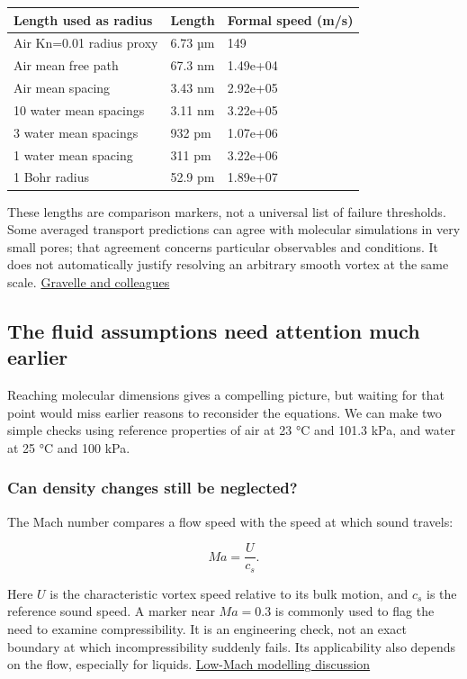 \documentclass[
  english,
  11pt,
]{article}
\newcounter{none} %
\begin{document}
{\def\LTcaptype{none} %
\begin{longtable}[]{@{}lll@{}}
\toprule\noalign{}
Length used as radius & Length & Formal speed (m/s) \\
\midrule\noalign{}
\endhead
\bottomrule\noalign{}
\endlastfoot
Air Kn=0.01 radius proxy & 6.73 µm & 149 \\
Air mean free path & 67.3 nm & 1.49e+04 \\
Air mean spacing & 3.43 nm & 2.92e+05 \\
10 water mean spacings & 3.11 nm & 3.22e+05 \\
3 water mean spacings & 932 pm & 1.07e+06 \\
1 water mean spacing & 311 pm & 3.22e+06 \\
1 Bohr radius & 52.9 pm & 1.89e+07 \\
\end{longtable}
}

These lengths are comparison markers, not a universal list of failure
thresholds. Some averaged transport predictions can agree with molecular
simulations in very small pores; that agreement concerns particular
observables and conditions. It does not automatically justify resolving
an arbitrary smooth vortex at the same scale.
\href{https://arxiv.org/abs/1501.01476}{Gravelle and colleagues}

\subsection{The fluid assumptions need attention much
earlier}\label{the-fluid-assumptions-need-attention-much-earlier}

Reaching molecular dimensions gives a compelling picture, but waiting
for that point would miss earlier reasons to reconsider the equations.
We can make two simple checks using reference properties of air at 23 °C
and 101.3 kPa, and water at 25 °C and 100 kPa.

\subsubsection{Can density changes still be
neglected?}\label{can-density-changes-still-be-neglected}

The Mach number compares a flow speed with the speed at which sound
travels:

\[
Ma=\frac{U}{c_s}.
\]

Here \(U\) is the characteristic vortex speed relative to its bulk
motion, and \(c_s\) is the reference sound speed. A marker near
\(Ma=0.3\) is commonly used to flag the need to examine compressibility.
It is an engineering check, not an exact boundary at which
incompressibility suddenly fails. Its applicability also depends on the
flow, especially for liquids.
\href{https://ntrs.nasa.gov/api/citations/19960045736/downloads/19960045736.pdf}{Low-Mach
modelling discussion}
\end{document}
